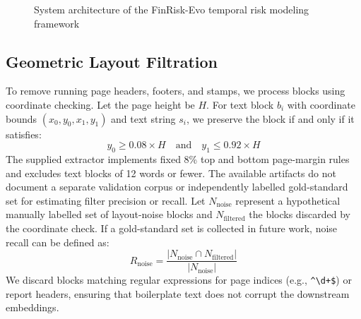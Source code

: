 \documentclass[pdflatex,sn-basic,Numbered]{sn-jnl}
\begin{document}
\begin{figure}[!t]
\centering
{}
\caption{System architecture of the FinRisk-Evo temporal risk modeling framework}
\label{fig:architecture}
\end{figure}
\subsection{Geometric Layout Filtration}
To remove running page headers, footers, and stamps, we process blocks using coordinate checking. Let the page height be $H$. For text block $b_i$ with coordinate bounds $(x_0, y_0, x_1, y_1)$ and text string $s_i$, we preserve the block if and only if it satisfies:
\begin{equation}
y_0 \ge 0.08 \times H \quad \text{and} \quad y_1 \le 0.92 \times H
\end{equation}
The supplied extractor implements fixed 8\% top and bottom page-margin rules and excludes text blocks of 12 words or fewer. The available artifacts do not document a separate validation corpus or independently labelled gold-standard set for estimating filter precision or recall. Let $N_{\text{noise}}$ represent a hypothetical manually labelled set of layout-noise blocks and $N_{\text{filtered}}$ the blocks discarded by the coordinate check. If a gold-standard set is collected in future work, noise recall can be defined as:
\begin{equation}
R_{\text{noise}} = \frac{|N_{\text{noise}} \cap N_{\text{filtered}}|}{|N_{\text{noise}}|}
\end{equation}
We discard blocks matching regular expressions for page indices (e.g., \verb|^\d+$|) or report headers, ensuring that boilerplate text does not corrupt the downstream embeddings.
\end{document}
